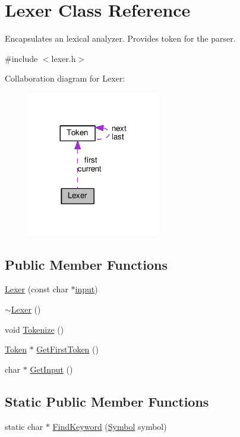 \hypertarget{classLexer}{}\section{Lexer Class Reference}
\label{classLexer}


Encapsulates an lexical analyzer. Provides token for the parser.  




{\ttfamily \#include $<$lexer.\+h$>$}



Collaboration diagram for Lexer\+:
\nopagebreak
\begin{figure}[H]
\begin{center}
\leavevmode
\includegraphics[width=164pt]{d3/d75/classLexer__coll__graph}
\end{center}
\end{figure}
\subsection*{Public Member Functions}
\begin{DoxyCompactItemize}
\item 
\hyperlink{classLexer_a8e12946738ee015bac381da30e2b03b0}{Lexer} (const char $\ast$\hyperlink{classLexer_a9ef909535b14de749d95e5a48217f1c9}{input})
\item 
\hyperlink{classLexer_ad26a84af23d8d303723e36e83fc4e556}{$\sim$\+Lexer} ()
\item 
void \hyperlink{classLexer_a02696cb1f974ae74116c2b746dcba365}{Tokenize} ()
\item 
\hyperlink{structToken}{Token} $\ast$ \hyperlink{classLexer_afbb12eaae7cff3bd2960f444cfe98f69}{Get\+First\+Token} ()
\item 
char $\ast$ \hyperlink{classLexer_a3032cbeb851294bccd61b722d9a86265}{Get\+Input} ()
\end{DoxyCompactItemize}
\subsection*{Static Public Member Functions}
\begin{DoxyCompactItemize}
\item 
static char $\ast$ \hyperlink{classLexer_affd4bac61db830383302be71198a372a}{Find\+Keyword} (\hyperlink{lex_8h_a7feef761cd73fac6e25b8bb80d2c4e54}{Symbol} symbol)
\end{DoxyCompactItemize}
